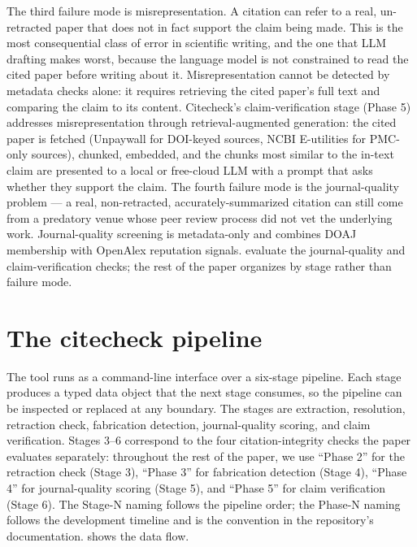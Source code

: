 \documentclass[12pt]{article}
\begin{document}
The third failure mode is misrepresentation. A citation can refer to a real, un-retracted paper that does not in fact support the claim being made. This is the most consequential class of error in scientific writing, and the one that LLM drafting makes worst, because the language model is not constrained to read the cited paper before writing about it. Misrepresentation cannot be detected by metadata checks alone: it requires retrieving the cited paper's full text and comparing the claim to its content. Citecheck's claim-verification stage (Phase 5) addresses misrepresentation through retrieval-augmented generation: the cited paper is fetched (Unpaywall for DOI-keyed sources, NCBI E-utilities for PMC-only sources), chunked, embedded, and the chunks most similar to the in-text claim are presented to a local or free-cloud LLM with a prompt that asks whether they support the claim. The fourth failure mode is the journal-quality problem --- a real, non-retracted, accurately-summarized citation can still come from a predatory venue whose peer review process did not vet the underlying work. Journal-quality screening is metadata-only and combines DOAJ membership with OpenAlex reputation signals.  evaluate the journal-quality and claim-verification checks; the rest of the paper organizes by stage rather than failure mode.

\section{The citecheck pipeline}\label{sec:tool}

The tool runs as a command-line interface over a six-stage pipeline. Each stage produces a typed data object that the next stage consumes, so the pipeline can be inspected or replaced at any boundary. The stages are extraction, resolution, retraction check, fabrication detection, journal-quality scoring, and claim verification. Stages 3--6 correspond to the four citation-integrity checks the paper evaluates separately: throughout the rest of the paper, we use ``Phase 2'' for the retraction check (Stage 3), ``Phase 3'' for fabrication detection (Stage 4), ``Phase 4'' for journal-quality scoring (Stage 5), and ``Phase 5'' for claim verification (Stage 6). The Stage-N naming follows the pipeline order; the Phase-N naming follows the development timeline and is the convention in the repository's documentation.  shows the data flow.
\end{document}
